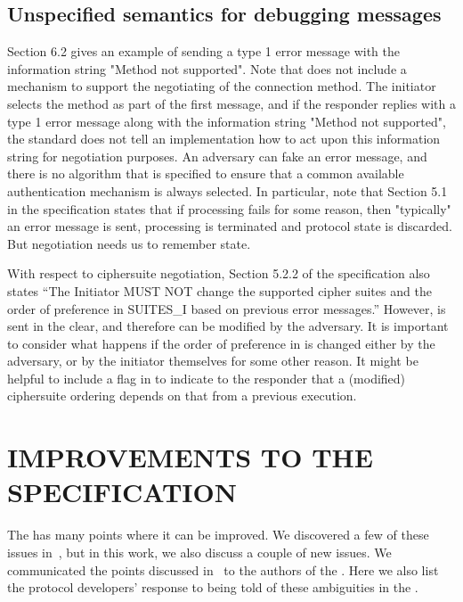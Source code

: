 \documentclass[runningheads]{llncs}
\begin{document}
\subsection{Unspecified semantics for debugging messages}
Section 6.2 gives an example of sending a type 1 error message with the information string "Method not supported".
%
Note that \mEdhoc{} does not include a mechanism to support the negotiating of the connection method.
%
The initiator selects the method as part of the first message, and if the responder replies with a type 1 error message along with the information string "Method not supported", the standard does not tell an implementation how to act upon this information string for negotiation purposes.
%
An adversary can fake an error message, and there is no algorithm that is specified to ensure that a common available authentication mechanism is always selected.
%
In particular, note that Section 5.1 in the specification states that if processing fails for some reason, then "typically" an error message is sent, processing is terminated and protocol state is discarded. 
%
But negotiation needs us to remember state.

With respect to ciphersuite negotiation, Section 5.2.2 of the specification also states ``The Initiator MUST NOT change the supported cipher suites and
the order of preference in SUITES\_I based on previous error messages.'' 
%
However, \mSuites is sent in the clear, and therefore can be modified by the adversary.
%
It is important to consider what happens if the order of preference in \mSuites is changed either by the adversary, or by the initiator themselves for some other reason.
%
It might be helpful to include a flag in \mMsgone to indicate to the responder that a (modified) ciphersuite ordering depends on that from a previous execution.

\section{\uppercase{Improvements to the specification}}
\label{sec:discussion}
The \mEdhoc{} \mSpec{} has many points where it can be improved. 
%
We discovered a few of these issues in~\cite{Norr21}, but in this work, we also discuss a couple of new issues.
%
We communicated the points discussed in~\cite{Norr21} to the authors of the \mSpec{}.
%
Here we also list the protocol developers' response to being told of these ambiguities in the \mSpec{}.
\end{document}

